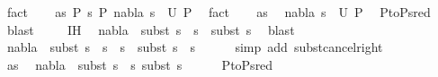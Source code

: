 \begin{isabellebody}
\ fact\isanewline
\ \ \isamarkupfalse%
\ as{\isacharcolon}{\kern0pt}\ {\isachardoublequoteopen}P{}\ {\isasymturnstile}s\ {\isasymleadsto}P{}{\isachardoublequoteclose}\ {\isachardoublequoteopen}{\isacharparenleft}{\kern0pt}nabla{}{\isacharcomma}{\kern0pt}\ s{}{\isacharparenright}{\kern0pt}\ {\isasymin}\ U\ P{}{\isachardoublequoteclose}\ \isamarkupfalse%
\ fact{\isacharplus}{\kern0pt}\isanewline
\isanewline
\ \ \isamarkupfalse%
\ as\ \isamarkupfalse%
\ {\isachardoublequoteopen}{\isacharparenleft}{\kern0pt}nabla{}{\isacharcomma}{\kern0pt}\ s{}{\isacharparenright}{\kern0pt}\ {\isasymin}\ U\ P{}{\isachardoublequoteclose}\ \isamarkupfalse%
\ P{}{\isacharunderscore}{\kern0pt}to{\isacharunderscore}{\kern0pt}P{}{\isacharunderscore}{\kern0pt}sred\ \isamarkupfalse%
\ blast\ \isanewline
\ \ \isamarkupfalse%
\ IH\ \isamarkupfalse%
\ {\isachardoublequoteopen}nabla{}\ {\isasymTurnstile}\ subst\ {\isacharparenleft}{\kern0pt}s{}\ {\isasymbullet}\ s{}{\isacharparenright}{\kern0pt}\ {\isasymapprox}\ subst\ s{}{\isachardoublequoteclose}\ \isamarkupfalse%
\ blast\isanewline
\ \ \isamarkupfalse%
\ \isamarkupfalse%
\ {\isachardoublequoteopen}nabla{}\ {\isasymTurnstile}\ subst\ {\isacharparenleft}{\kern0pt}{\isacharparenleft}{\kern0pt}s{}\ {\isasymbullet}\ s{}{\isacharparenright}{\kern0pt}\ {\isasymbullet}\ s{\isacharparenright}{\kern0pt}\ {\isasymapprox}\ subst\ {\isacharparenleft}{\kern0pt}s{}\ {\isasymbullet}\ s{\isacharparenright}{\kern0pt}{\isachardoublequoteclose}\isanewline
\ \ \ \ \isamarkupfalse%
\ {\isacharparenleft}{\kern0pt}simp\ add{\isacharcolon}{\kern0pt}\ subst{\isacharunderscore}{\kern0pt}cancel{\isacharunderscore}{\kern0pt}right{\isacharparenright}{\kern0pt}\ \ \isanewline
\ \ \isamarkupfalse%
\isanewline
\ \ \isamarkupfalse%
\ as\ \isamarkupfalse%
\ {\isachardoublequoteopen}nabla{}\ {\isasymTurnstile}\ subst\ {\isacharparenleft}{\kern0pt}s{}\ {\isasymbullet}\ s{\isacharparenright}{\kern0pt}\ {\isasymapprox}subst\ s{}{\isachardoublequoteclose}\isanewline
\ \ \ \ \isamarkupfalse%
\ P{}{\isacharunderscore}{\kern0pt}to{\isacharunderscore}{\kern0pt}P{}{\isacharunderscore}{\kern0pt}sred\ \isamarkupfalse%

\end{isabellebody}
